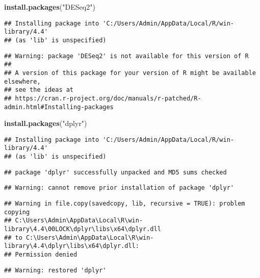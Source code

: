 \documentclass[
]{article}
\newenvironment{Shaded}{\begin{snugshade}}{\end{snugshade}}
\newcommand{\FunctionTok}[1]{\textcolor[rgb]{0.13,0.29,0.53}{\textbf{#1}}}
\newcommand{\NormalTok}[1]{#1}
\newcommand{\StringTok}[1]{\textcolor[rgb]{0.31,0.60,0.02}{#1}}
\begin{document}
\begin{Shaded}
\begin{Highlighting}[]
\FunctionTok{install.packages}\NormalTok{(}\StringTok{"DESeq2"}\NormalTok{)}
\end{Highlighting}
\end{Shaded}

\begin{verbatim}
## Installing package into 'C:/Users/Admin/AppData/Local/R/win-library/4.4'
## (as 'lib' is unspecified)
\end{verbatim}

\begin{verbatim}
## Warning: package 'DESeq2' is not available for this version of R
## 
## A version of this package for your version of R might be available elsewhere,
## see the ideas at
## https://cran.r-project.org/doc/manuals/r-patched/R-admin.html#Installing-packages
\end{verbatim}

\begin{Shaded}
\begin{Highlighting}[]
\FunctionTok{install.packages}\NormalTok{(}\StringTok{"dplyr"}\NormalTok{)}
\end{Highlighting}
\end{Shaded}

\begin{verbatim}
## Installing package into 'C:/Users/Admin/AppData/Local/R/win-library/4.4'
## (as 'lib' is unspecified)
\end{verbatim}

\begin{verbatim}
## package 'dplyr' successfully unpacked and MD5 sums checked
\end{verbatim}

\begin{verbatim}
## Warning: cannot remove prior installation of package 'dplyr'
\end{verbatim}

\begin{verbatim}
## Warning in file.copy(savedcopy, lib, recursive = TRUE): problem copying
## C:\Users\Admin\AppData\Local\R\win-library\4.4\00LOCK\dplyr\libs\x64\dplyr.dll
## to C:\Users\Admin\AppData\Local\R\win-library\4.4\dplyr\libs\x64\dplyr.dll:
## Permission denied
\end{verbatim}

\begin{verbatim}
## Warning: restored 'dplyr'
\end{verbatim}
\end{document}
